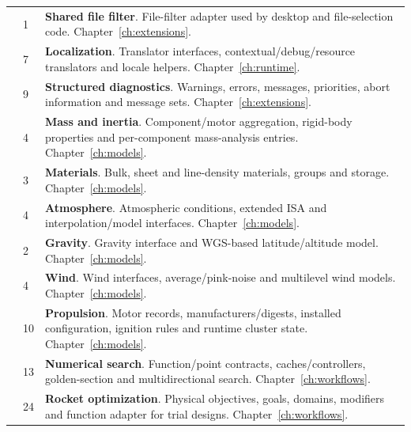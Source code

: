 \begin{longtable}{@{}L{4.6cm}L{0.8cm}L{10.2cm}@{}}
 & 1 & \textbf{Shared file filter}. File-filter adapter used by desktop and file-selection code. Chapter~\ref{ch:extensions}.\\

 & 7 & \textbf{Localization}. Translator interfaces, contextual/debug/resource translators and locale helpers. Chapter~\ref{ch:runtime}.\\

 & 9 & \textbf{Structured diagnostics}. Warnings, errors, messages, priorities, abort information and message sets. Chapter~\ref{ch:extensions}.\\

 & 4 & \textbf{Mass and inertia}. Component/motor aggregation, rigid-body properties and per-component mass-analysis entries. Chapter~\ref{ch:models}.\\

 & 3 & \textbf{Materials}. Bulk, sheet and line-density materials, groups and storage. Chapter~\ref{ch:models}.\\

 & 4 & \textbf{Atmosphere}. Atmospheric conditions, extended ISA and interpolation/model interfaces. Chapter~\ref{ch:models}.\\

 & 2 & \textbf{Gravity}. Gravity interface and WGS-based latitude/altitude model. Chapter~\ref{ch:models}.\\

 & 4 & \textbf{Wind}. Wind interfaces, average/pink-noise and multilevel wind models. Chapter~\ref{ch:models}.\\

 & 10 & \textbf{Propulsion}. Motor records, manufacturers/digests, installed configuration, ignition rules and runtime cluster state. Chapter~\ref{ch:models}.\\

 & 13 & \textbf{Numerical search}. Function/point contracts, caches/controllers, golden-section and multidirectional search. Chapter~\ref{ch:workflows}.\\

 & 24 & \textbf{Rocket optimization}. Physical objectives, goals, domains, modifiers and function adapter for trial designs. Chapter~\ref{ch:workflows}.\\


\end{longtable}
